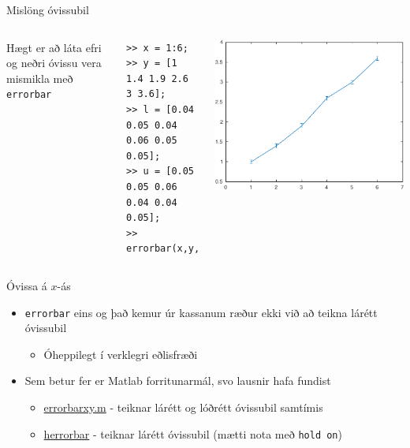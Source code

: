 \documentclass{beamer}
\begin{document}
\begin{frame}[fragile]{Mislöng óvissubil}
\begin{columns}
Hægt er að láta efri og neðri óvissu vera mismikla með \texttt{errorbar}
\begin{verbatim}
>> x = 1:6;
>> y = [1 1.4 1.9 2.6 3 3.6];
>> l = [0.04 0.05 0.04 0.06 0.05 0.05];
>> u = [0.05 0.05 0.06 0.04 0.04 0.05];
>> errorbar(x,y,l,u)
\end{verbatim}
\includegraphics[width=\textwidth]{Pics/uneven-errorbar}
\end{columns}
\end{frame}

\begin{frame}{Óvissa á $x$-ás}
\begin{itemize}
 \item \texttt{errorbar} eins og það kemur úr kassanum ræður ekki við að teikna lárétt óvissubil
 \begin{itemize}
  \item Óheppilegt í verklegri eðlisfræði
 \end{itemize}
 \item Sem betur fer er Matlab forritunarmál, svo lausnir hafa fundist
 \begin{itemize}
  \item \href{http://www.mathworks.com/matlabcentral/fileexchange/40221-plot-data-with-error-bars-on-both-x-and-y-axes}{errorbarxy.m} - teiknar lárétt og lóðrétt óvissubil samtímis
  \item \href{http://www.mathworks.com/matlabcentral/fileexchange/3963-herrorbar}{herrorbar} - teiknar lárétt óvissubil (mætti nota með \texttt{hold on})
 \end{itemize}
\end{itemize}
\end{frame}
\end{document}
